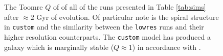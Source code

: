 \begin{figure}[!ht]
    \leavevmode\rlap{\usebox{\graphicsbox}}%
    \begin{minipage}[b]{0.63\wd\graphicsbox}%
        \caption{The Toomre $Q$ of of all of the runs presented in Table \ref{tab:sims} after $\approx 2$ Gyr of evolution. Of particular note is the spiral structure in {\tt custom} and the similarity between the {\tt lowres} runs and their higher resolution counterparts. The {\tt custom} model has produced a galaxy which is marginally stable ($Q\approx 1$) in accordance with \citet{hopkins_stellar_2012}.}
        \label{fig:toomqsimbigfig}
    \end{minipage}\hspace*{0.33\wd\graphicsbox}%
\end{figure}

